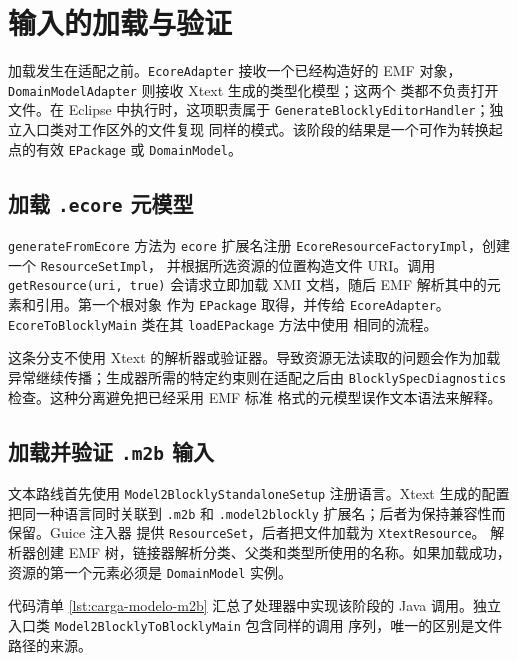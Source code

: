 \section{输入的加载与验证}
\label{sec:carga-validacion-entradas}

加载发生在适配之前。\texttt{EcoreAdapter} 接收一个已经构造好的 EMF
对象，\texttt{DomainModelAdapter} 则接收 Xtext 生成的类型化模型；这两个
类都不负责打开文件。在 Eclipse 中执行时，这项职责属于
\texttt{GenerateBlocklyEditorHandler}；独立入口类对工作区外的文件复现
同样的模式。该阶段的结果是一个可作为转换起点的有效
\texttt{EPackage} 或 \texttt{DomainModel}。

\subsection{加载 \texttt{.ecore} 元模型}

\texttt{generateFromEcore} 方法为 \texttt{ecore} 扩展名注册
\texttt{EcoreResource}\allowbreak\texttt{FactoryImpl}，创建一个
\texttt{ResourceSet}\allowbreak\texttt{Impl}，
并根据所选资源的位置构造文件 URI。调用 \texttt{getResource(uri, true)}
会请求立即加载 XMI 文档，随后 EMF 解析其中的元素和引用。第一个根对象
作为 \texttt{EPackage} 取得，并传给 \texttt{EcoreAdapter}。
\texttt{EcoreToBlocklyMain} 类在其 \texttt{loadEPackage} 方法中使用
相同的流程。

这条分支不使用 Xtext 的解析器或验证器。导致资源无法读取的问题会作为加载
异常继续传播；生成器所需的特定约束则在适配之后由
\texttt{BlocklySpecDiagnostics} 检查。这种分离避免把已经采用 EMF 标准
格式的元模型误作文本语法来解释。

\subsection{加载并验证 \texttt{.m2b} 输入}

文本路线首先使用 \texttt{Model2BlocklyStandalone}\allowbreak\texttt{Setup}
注册语言。Xtext 生成的配置把同一种语言同时关联到 \texttt{.m2b} 和
\texttt{.model2blockly} 扩展名；后者为保持兼容性而保留。Guice 注入器
提供 \texttt{ResourceSet}，后者把文件加载为 \texttt{XtextResource}。
解析器创建 EMF 树，链接器解析分类、父类和类型所使用的名称。如果加载成功，
资源的第一个元素必须是 \texttt{DomainModel} 实例。

代码清单 \ref{lst:carga-modelo-m2b} 汇总了处理器中实现该阶段的 Java
调用。独立入口类 \texttt{Model2BlocklyTo}\allowbreak\texttt{BlocklyMain}
包含同样的调用
序列，唯一的区别是文件路径的来源。


